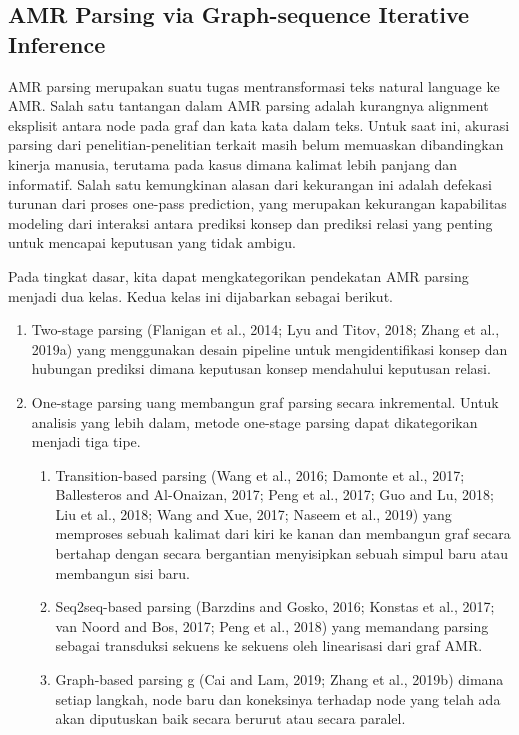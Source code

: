 \subsection{AMR Parsing via Graph-sequence Iterative Inference }

AMR parsing merupakan suatu tugas mentransformasi teks natural language ke AMR.
Salah satu tantangan dalam AMR parsing adalah kurangnya alignment eksplisit antara node pada graf dan kata kata dalam teks.
Untuk saat ini, akurasi parsing dari penelitian-penelitian terkait masih belum memuaskan dibandingkan kinerja manusia, terutama pada kasus dimana kalimat lebih panjang dan informatif.
Salah satu kemungkinan alasan dari kekurangan ini adalah defekasi turunan dari proses one-pass prediction, yang merupakan kekurangan kapabilitas modeling dari interaksi antara prediksi konsep dan prediksi relasi yang penting untuk mencapai keputusan yang tidak ambigu.

Pada tingkat dasar, kita dapat mengkategorikan pendekatan AMR parsing menjadi dua kelas.
Kedua kelas ini dijabarkan sebagai berikut.
\begin{enumerate}
  \item Two-stage parsing (Flanigan et al., 2014; Lyu and Titov, 2018; Zhang et al., 2019a) yang menggunakan desain pipeline untuk mengidentifikasi konsep dan hubungan prediksi dimana keputusan konsep mendahului keputusan relasi.

  \item One-stage parsing uang membangun graf parsing secara inkremental.
  Untuk analisis yang lebih dalam, metode one-stage parsing dapat dikategorikan menjadi tiga tipe.
  \begin{enumerate}
      \item Transition-based parsing (Wang et al., 2016; Damonte et al., 2017; Ballesteros and Al-Onaizan, 2017; Peng et al., 2017; Guo and Lu, 2018; Liu et al., 2018; Wang and Xue, 2017; Naseem et al., 2019) yang memproses sebuah kalimat dari kiri ke kanan dan membangun graf secara bertahap dengan secara bergantian menyisipkan sebuah simpul baru atau membangun sisi baru.

      \item Seq2seq-based parsing (Barzdins and Gosko, 2016; Konstas et al., 2017; van Noord and Bos, 2017; Peng et al., 2018) yang memandang parsing sebagai transduksi sekuens ke sekuens oleh linearisasi dari graf AMR.

      \item Graph-based parsing g (Cai and Lam, 2019; Zhang et al., 2019b) dimana setiap langkah, node baru dan koneksinya terhadap node yang telah ada akan diputuskan baik secara berurut atau secara paralel.
  \end{enumerate}
\end{enumerate}

